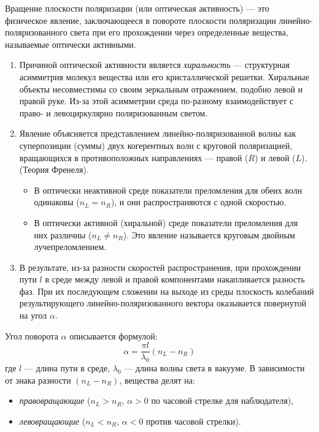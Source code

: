 Вращение плоскости поляризации (или оптическая активность) — это физическое явление, заключающееся в повороте плоскости поляризации линейно-поляризованного света при его прохождении через определенные вещества, называемые оптически активными.

\begin{enumerate}
    \item Причиной оптической активности является \textit{хиральность} — структурная асимметрия молекул вещества или его кристаллической решетки. Хиральные объекты несовместимы со своим зеркальным отражением, подобно левой и правой руке. Из-за этой асимметрии среда по-разному взаимодействует с право- и левоциркулярно поляризованным светом.
    
    \item Явление объясняется представлением линейно-поляризованной волны как суперпозиции (суммы) двух когерентных волн с круговой поляризацией, вращающихся в противоположных направлениях — правой ($R$) и левой ($L$). (Теория Френеля).
        \begin{itemize}
            \item В оптически неактивной среде показатели преломления для обеих волн одинаковы ($n_L = n_R$), и они распространяются с одной скоростью.
            \item В оптически активной (хиральной) среде показатели преломления для них различны ($n_L \neq n_R$). Это явление называется круговым двойным лучепреломлением.
        \end{itemize}
        
    \item В результате, из-за разности скоростей распространения, при прохождении пути $l$ в среде между левой и правой компонентами накапливается разность фаз. При их последующем сложении на выходе из среды плоскость колебаний результирующего линейно-поляризованного вектора оказывается повернутой на угол $\alpha$.
\end{enumerate}

Угол поворота $\alpha$ описывается формулой:
$$
\alpha = \frac{\pi l}{\lambda_0} (n_L - n_R)
$$
где $l$ — длина пути в среде, $\lambda_0$ — длина волны света в вакууме. В зависимости от знака разности $(n_L - n_R)$, вещества делят на:
\begin{itemize}
    \item \textit{правовращающие} ($n_L > n_R$, $\alpha > 0$ по часовой стрелке для наблюдателя),
    \item \textit{левовращающие} ($n_L < n_R$, $\alpha < 0$ против часовой стрелки).
\end{itemize}


